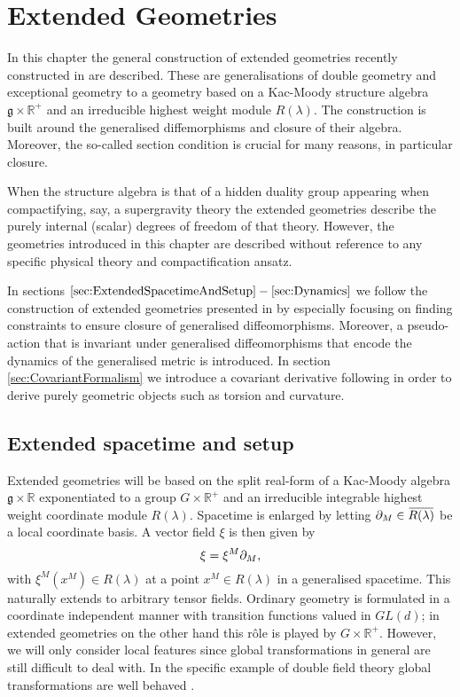 \chapter{Extended Geometries}\label{chap:ExtendedGeometries}
In this chapter the general construction of extended geometries recently constructed in \cite{CederwallPalmkvist2017} are described. These are generalisations of double geometry and exceptional geometry to a geometry based on a Kac-Moody structure algebra $\mathfrak{g}\times\mathbb{R}^+$ and an irreducible highest weight module $R(\lambda)$. The construction is built around the generalised diffemorphisms and closure of their algebra. Moreover, the so-called section condition is crucial for many reasons, in particular closure.

When the structure algebra is that of a hidden duality group appearing when compactifying, say, a supergravity theory the extended geometries describe the purely internal (scalar) degrees of freedom of that theory. However, the geometries introduced in this chapter are described without reference to any specific physical theory and compactification ansatz. 

In sections $\ref{sec:ExtendedSpacetimeAndSetup}-\ref{sec:Dynamics}$ we follow the construction of extended geometries presented in \cite{CederwallPalmkvist2017} by especially focusing on finding constraints to ensure closure of generalised diffeomorphisms. Moreover, a pseudo-action that is invariant under generalised diffeomorphisms that encode the dynamics of the generalised metric is introduced. In section \ref{sec:CovariantFormalism} we introduce a covariant derivative following \cite{Cederwall:2013naa} in order to derive purely geometric objects such as torsion and curvature. %

\section{Extended spacetime and setup\label{sec:ExtendedSpacetimeAndSetup}}
Extended geometries will be based on the split real-form of a Kac-Moody algebra $\mathfrak{g}\times\mathbb{R}$ exponentiated to a group $G\times\mathbb{R}^+$ and an irreducible integrable highest weight coordinate module $R(\lambda)$. Spacetime is enlarged by letting $\pd_M\in\overbar{R(\lambda)}$ be a local coordinate basis. A vector field $\xi$ is then given by 
\begin{equation}
    \xi = \xi^M\partial_M,
\end{equation}
with $\xi^M(x^M)\in R(\lambda)$ at a point $x^M\in R(\lambda)$ in a generalised spacetime. This naturally extends to arbitrary tensor fields. Ordinary geometry is formulated in a coordinate independent manner with transition functions valued in $GL(d)$; in extended geometries on the other hand this rôle is played by $G\times\mathbb{R}^+$. However, we will only consider local features since global transformations in general are still difficult to deal with. In the specific example of double field theory global transformations are well behaved \cite{Hohm:2012gk,Berman:2014jba}.

